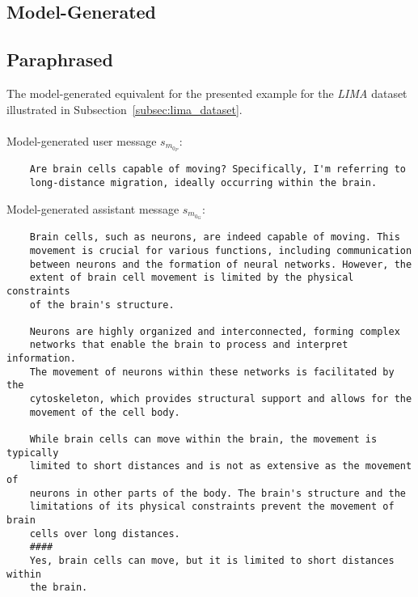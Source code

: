 \subsection{Model-Generated}\subsection{Paraphrased}\label{subsec:appendix_model_generated_sample}
The model-generated equivalent for the presented example for the \emph{LIMA} dataset illustrated in Subsection~\ref{subsec:lima_dataset}.
\\\\
Model-generated user message $s_{m_{0_P}}$:
\begin{verbatim}
    Are brain cells capable of moving? Specifically, I'm referring to
    long-distance migration, ideally occurring within the brain.
\end{verbatim}
Model-generated assistant message $s_{m_{0_G}}$:
\begin{verbatim}
    Brain cells, such as neurons, are indeed capable of moving. This 
    movement is crucial for various functions, including communication 
    between neurons and the formation of neural networks. However, the 
    extent of brain cell movement is limited by the physical constraints
    of the brain's structure.

    Neurons are highly organized and interconnected, forming complex 
    networks that enable the brain to process and interpret information.
    The movement of neurons within these networks is facilitated by the 
    cytoskeleton, which provides structural support and allows for the 
    movement of the cell body.
    
    While brain cells can move within the brain, the movement is typically
    limited to short distances and is not as extensive as the movement of 
    neurons in other parts of the body. The brain's structure and the 
    limitations of its physical constraints prevent the movement of brain
    cells over long distances.
    ####
    Yes, brain cells can move, but it is limited to short distances within 
    the brain.
\end{verbatim}
